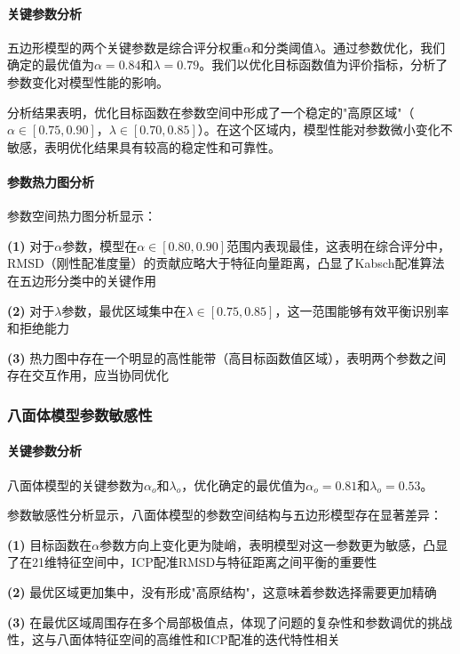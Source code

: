\paragraph{关键参数分析}

五边形模型的两个关键参数是综合评分权重$\alpha$和分类阈值$\lambda$。通过参数优化，我们确定的最优值为$\alpha = 0.84$和$\lambda = 0.79$。我们以优化目标函数值为评价指标，分析了参数变化对模型性能的影响。

分析结果表明，优化目标函数在参数空间中形成了一个稳定的"高原区域"（$\alpha \in [0.75, 0.90]$，$\lambda \in [0.70, 0.85]$）。在这个区域内，模型性能对参数微小变化不敏感，表明优化结果具有较高的稳定性和可靠性。

\paragraph{参数热力图分析}

参数空间热力图分析显示：

\textbf{(1)} 对于$\alpha$参数，模型在$\alpha \in [0.80, 0.90]$范围内表现最佳，这表明在综合评分中，RMSD（刚性配准度量）的贡献应略大于特征向量距离，凸显了Kabsch配准算法在五边形分类中的关键作用

\textbf{(2)} 对于$\lambda$参数，最优区域集中在$\lambda \in [0.75, 0.85]$，这一范围能够有效平衡识别率和拒绝能力

\textbf{(3)} 热力图中存在一个明显的高性能带（高目标函数值区域），表明两个参数之间存在交互作用，应当协同优化

\subsubsection{八面体模型参数敏感性}

\paragraph{关键参数分析}

八面体模型的关键参数为$\alpha_o$和$\lambda_o$，优化确定的最优值为$\alpha_o = 0.81$和$\lambda_o = 0.53$。

参数敏感性分析显示，八面体模型的参数空间结构与五边形模型存在显著差异：

\textbf{(1)} 目标函数在$\alpha$参数方向上变化更为陡峭，表明模型对这一参数更为敏感，凸显了在21维特征空间中，ICP配准RMSD与特征距离之间平衡的重要性

\textbf{(2)} 最优区域更加集中，没有形成"高原结构"，这意味着参数选择需要更加精确

\textbf{(3)} 在最优区域周围存在多个局部极值点，体现了问题的复杂性和参数调优的挑战性，这与八面体特征空间的高维性和ICP配准的迭代特性相关

